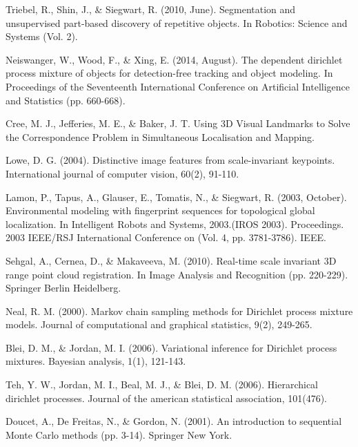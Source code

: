\documentclass[twoside,hidelinks]{article}
\begin{document}
\begin{thebibliography}{9}
\newblock Triebel, R., Shin, J., \& Siegwart, R. (2010, June). Segmentation and unsupervised part-based discovery of repetitive objects. In Robotics: Science and Systems (Vol. 2).

\newblock Neiswanger, W., Wood, F., \& Xing, E. (2014, August). The dependent dirichlet process mixture of objects for detection-free tracking and object modeling. In Proceedings of the Seventeenth International Conference on Artificial Intelligence and Statistics (pp. 660-668).

\newblock Cree, M. J., Jefferies, M. E., \& Baker, J. T. Using 3D Visual Landmarks to Solve the Correspondence Problem in Simultaneous Localisation and Mapping.

\newblock Lowe, D. G. (2004). Distinctive image features from scale-invariant keypoints. International journal of computer vision, 60(2), 91-110.

\newblock Lamon, P., Tapus, A., Glauser, E., Tomatis, N., \& Siegwart, R. (2003, October). Environmental modeling with fingerprint sequences for topological global localization. In Intelligent Robots and Systems, 2003.(IROS 2003). Proceedings. 2003 IEEE/RSJ International Conference on (Vol. 4, pp. 3781-3786). IEEE.


\newblock Sehgal, A., Cernea, D., \& Makaveeva, M. (2010). Real-time scale invariant 3D range point cloud registration. In Image Analysis and Recognition (pp. 220-229). Springer Berlin Heidelberg.

\newblock Neal, R. M. (2000). Markov chain sampling methods for Dirichlet process mixture models. Journal of computational and graphical statistics, 9(2), 249-265.

\newblock Blei, D. M., \& Jordan, M. I. (2006). Variational inference for Dirichlet process mixtures. Bayesian analysis, 1(1), 121-143.


\newblock Teh, Y. W., Jordan, M. I., Beal, M. J., \& Blei, D. M. (2006). Hierarchical dirichlet processes. Journal of the american statistical association, 101(476).

\newblock Doucet, A., De Freitas, N., \& Gordon, N. (2001). An introduction to sequential Monte Carlo methods (pp. 3-14). Springer New York.


\end{thebibliography}
\end{document}
